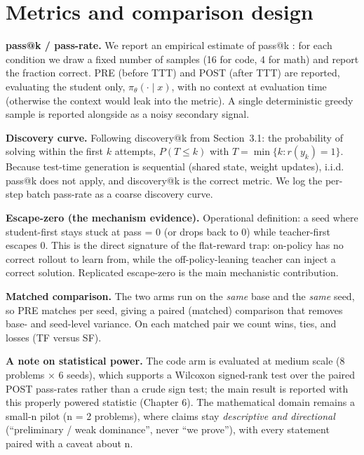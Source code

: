 \section{Metrics and comparison design}\label{metrics-and-comparison-design}

\textbf{pass@k / pass-rate.} We report an empirical estimate of pass@k \cite{r9}: for each condition we draw a fixed number of samples (16 for code, 4 for math) and report the fraction correct. PRE (before TTT) and POST (after TTT) are reported, evaluating the student only, \(\pi_\theta(\cdot\mid x)\), with no context at evaluation time (otherwise the context would leak into the metric). A single deterministic greedy sample is reported alongside as a noisy secondary signal.

\textbf{Discovery curve.} Following discovery@k \cite{r1} from Section~3.1: the probability of solving within the first \(k\) attempts, \(P(T \le k)\) with \(T = \min\{k : r(y_k) = 1\}\). Because test-time generation is sequential (shared state, weight updates), i.i.d. pass@k does not apply, and discovery@k is the correct metric. We log the per-step batch pass-rate as a coarse discovery curve.

\textbf{Escape-zero (the mechanism evidence).} Operational definition: a seed where student-first stays stuck at pass = 0 (or drops back to 0) while teacher-first escapes 0. This is the direct signature of the flat-reward trap: on-policy has no correct rollout to learn from, while the off-policy-leaning teacher can inject a correct solution. Replicated escape-zero is the main mechanistic contribution.

\textbf{Matched comparison.} The two arms run on the \emph{same} base and the \emph{same} seed, so PRE matches per seed, giving a paired (matched) comparison that removes base- and seed-level variance. On each matched pair we count wins, ties, and losses (TF versus SF).

\textbf{A note on statistical power.} The code arm is evaluated at medium scale (8 problems × 6 seeds), which supports a Wilcoxon signed-rank test over the paired POST pass-rates rather than a crude sign test; the main result is reported with this properly powered statistic (Chapter 6). The mathematical domain remains a small-n pilot (n = 2 problems), where claims stay \emph{descriptive and directional} (``preliminary / weak dominance'', never ``we prove''), with every statement paired with a caveat about n.
